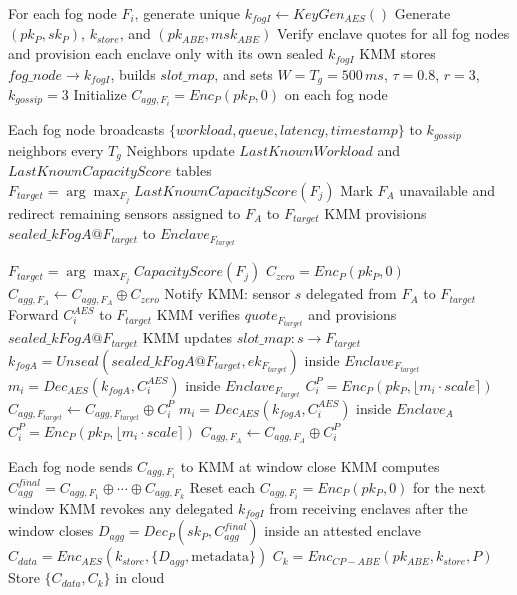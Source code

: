 \documentclass[conference]{IEEEtran}
\begin{document}
    \begin{algorithm}
    \caption{Fog-Scoped TEE-Assisted Paillier Slot Aggregation with Load Balancing and Fault Tolerance}
    \begin{algorithmic}[1]

    \STATE For each fog node $F_i$, generate unique $k_{fogI}\leftarrow KeyGen_{AES}()$
    \STATE Generate $(pk_P,sk_P)$, $k_{store}$, and $(pk_{ABE},msk_{ABE})$
    \STATE Verify enclave quotes for all fog nodes and provision each enclave only with its own sealed $k_{fogI}$
    \STATE KMM stores $fog\_node\rightarrow k_{fogI}$, builds $slot\_map$, and sets $W=T_g=500\,ms$, $\tau=0.8$, $r=3$, $k_{gossip}=3$
    \STATE Initialize $C_{agg,F_i}=Enc_P(pk_P,0)$ on each fog node

    \STATE Each fog node broadcasts $\{workload,queue,latency,timestamp\}$ to $k_{gossip}$ neighbors every $T_g$
    \STATE Neighbors update $LastKnownWorkload$ and $LastKnownCapacityScore$ tables
        \STATE $F_{target}=\arg\max_{F_j} LastKnownCapacityScore(F_j)$
        \STATE Mark $F_A$ unavailable and redirect remaining sensors assigned to $F_A$ to $F_{target}$
        \STATE KMM provisions $sealed\_kFogA@F_{target}$ to $Enclave_{F_{target}}$
    \ENDIF

            \STATE $F_{target}=\arg\max_{F_j} CapacityScore(F_j)$
            \STATE $C_{zero}=Enc_P(pk_P,0)$
            \STATE $C_{agg,F_A}\leftarrow C_{agg,F_A}\oplus C_{zero}$
            \STATE Notify KMM: sensor $s$ delegated from $F_A$ to $F_{target}$
            \STATE Forward $C_i^{AES}$ to $F_{target}$
            \STATE KMM verifies $quote_{F_{target}}$ and provisions $sealed\_kFogA@F_{target}$
            \STATE KMM updates $slot\_map:s\rightarrow F_{target}$
            \STATE $k_{fogA}=Unseal(sealed\_kFogA@F_{target},ek_{F_{target}})$ inside $Enclave_{F_{target}}$
            \STATE $m_i=Dec_{AES}(k_{fogA},C_i^{AES})$ inside $Enclave_{F_{target}}$
            \STATE $C_i^P=Enc_P(pk_P,\lfloor m_i\cdot scale\rceil)$
            \STATE $C_{agg,F_{target}}\leftarrow C_{agg,F_{target}}\oplus C_i^P$
        \ELSE
            \STATE $m_i=Dec_{AES}(k_{fogA},C_i^{AES})$ inside $Enclave_A$
            \STATE $C_i^P=Enc_P(pk_P,\lfloor m_i\cdot scale\rceil)$
            \STATE $C_{agg,F_A}\leftarrow C_{agg,F_A}\oplus C_i^P$
        \ENDIF
    \ENDFOR

    \STATE Each fog node sends $C_{agg,F_i}$ to KMM at window close
    \STATE KMM computes $C_{agg}^{final}=C_{agg,F_1}\oplus\cdots\oplus C_{agg,F_k}$
    \STATE Reset each $C_{agg,F_i}=Enc_P(pk_P,0)$ for the next window
    \STATE KMM revokes any delegated $k_{fogI}$ from receiving enclaves after the window closes
    \STATE $D_{agg}=Dec_P(sk_P,C_{agg}^{final})$ inside an attested enclave
    \STATE $C_{data}=Enc_{AES}(k_{store},\{D_{agg},\mathrm{metadata}\})$
    \STATE $C_k=Enc_{CP-ABE}(pk_{ABE},k_{store},P)$
    \STATE Store $\{C_{data},C_k\}$ in cloud

    \end{algorithmic}
    \end{algorithm}
\end{document}
